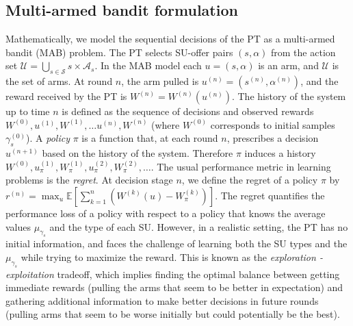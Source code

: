 \subsection {Multi-armed bandit formulation}
Mathematically, we model the sequential decisions of the PT as a multi-armed bandit (MAB) problem.
The PT selects SU-offer pairs $(s,\alpha)$ from the action set $\mathcal{U}=\underset{s\in\mathcal{S}}\bigcup s\times\mathcal{A}_s$.
In the MAB model each $u = (s,\alpha)$ is an arm, and $\mathcal{U}$ is the set of arms.
At round $n$, the arm pulled is $u^{(n)} = (s^{(n)},\alpha^{(n)})$, and the reward received by the PT is $W^{(n)} = W^{(n)}(u^{(n)})$.
The history of the system up to time $n$ is defined as the sequence of decisions and observed rewards $W^{(0)},u^{(1)}, W^{(1)},\ldots u^{(n)}, W^{(n)}$ (where $W^{(0)}$ corresponds to initial samples $\gamma_s^{(0)}$).
A \textit{policy} $\pi$ is a function that, at each round $n$, prescribes a decision $u^{(n+1)}$ based on the history of the system. Therefore $\pi$ induces a history $W^{(0)},u_\pi^{(1)},W_\pi^{(1)},u_\pi^{(2)},W_\pi^{(2)},\ldots$. 
The usual performance metric in learning problems is the \textit{regret}. 
At decision stage $n$, we define the regret of a policy $\pi$ by $r^{(n)} = \max_{u}\mathbb{E}\left[\sum_{k=1}^{n}\left(W^{(k)}(u) - W^{(k)}_{\pi}\right)\right]$.
The regret quantifies the performance loss of a policy with respect to a policy that knows the average values
$\mu_{\gamma_s}$ and the type of each SU.
However, in a realistic setting, the PT has no initial information, and faces the challenge of learning both the SU types and the $\mu_{\gamma_s}$ while trying to maximize the reward. 
This is known as the \textit{exploration - exploitation} tradeoff, which implies finding the optimal balance between getting immediate rewards (pulling the arms that seem to be better in expectation) and gathering additional information to make better decisions in future rounds (pulling arms that seem to be worse initially but could potentially be the best).

